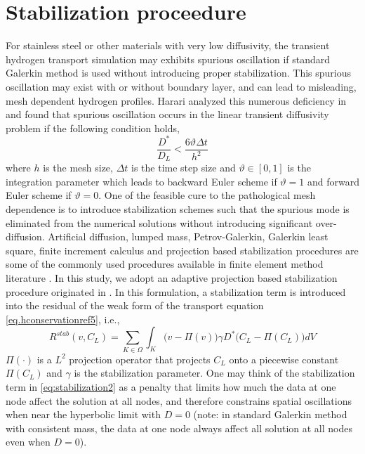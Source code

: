 \documentclass[10pt]{elsarticle}
\begin{document}
\section{Stabilization proceedure}
\label{sec:appendixStab}
For stainless steel or other materials with very low diffusivity, the transient hydrogen
transport simulation may exhibits spurious oscillation if standard Galerkin method is
used without introducing proper stabilization. This spurious oscillation may exist
with or without boundary layer, and can lead to misleading, mesh dependent hydrogen profiles. Harari analyzed this numerous deficiency in \citep{Harari:2004} and found that spurious oscillation occurs in the linear transient diffusivity problem if the following condition holds, 
\begin{equation}
\label{eq:StabilityLimit} \frac{D^{*}}{D_{L}} < \frac{6 \vartheta \Delta t}{h^{2}}
\end{equation}
where $h$ is the mesh size, $\Delta t$ is the time step size and $\vartheta \in [0,1]$
is the integration parameter which leads to backward Euler scheme if $\vartheta = 1$
and forward Euler scheme if $\vartheta = 0$. One of the feasible cure to the
pathological mesh dependence is to introduce stabilization schemes such that
the spurious mode is eliminated from the numerical solutions without introducing
significant over-diffusion. Artificial diffusion,
lumped mass, Petrov-Galerkin, Galerkin least square, finite increment calculus and
projection based stabilization procedures are some of the commonly used
procedures available in finite element method literature \citep{Onate:2000,
Dohrmann:2004, Johnson:2009, Sun:2013}. 
In this study, we adopt an adaptive projection based stabilization procedure
originated in \citep{Sun:2013}. In this formulation,  a stabilization term is introduced into the residual of the weak
form of the transport equation \eqref{eq.hconservationref5}, i.e.,
\begin{equation}
\label{eq:stabilization2} R^{stab}(v, C_{L}) = \sum_{K \in \Omega}  \int_{K}  \Big( v  - \Pi (v)  \Big)  \gamma D^{*} \Big( C_{L} - \Pi (C_{L}) \Big)  dV
\end{equation}
$\Pi(\cdot)$ is a $L^{2}$ projection operator that projects $C_{L}$ onto a piecewise constant $\Pi (C_{L})$ and $\gamma$ is the stabilization parameter. One may think of the stabilization term in \eqref{eq:stabilization2} as a penalty that limits how much the data at one node affect the solution at all nodes, and therefore constrains spatial oscillations when near the hyperbolic limit with $D=0$ (note: in standard Galerkin method with consistent mass, the data at one node always affect all solution at all nodes even when $D=0$).
\end{document}
